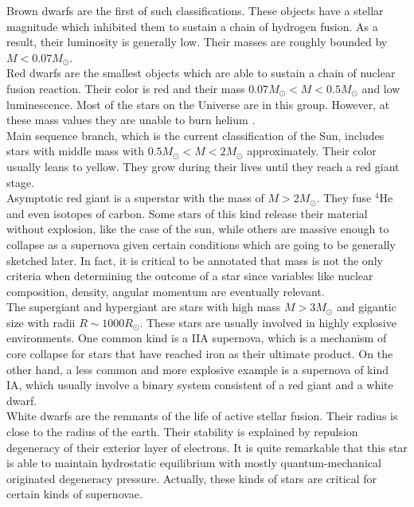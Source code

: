 \documentclass[openany]{book}
\begin{document}
Brown dwarfs are the first of such classifications. These objects have a stellar magnitude which inhibited them to sustain a chain of hydrogen fusion. As a result, their luminosity is generally low. Their masses are roughly bounded by $M < 0.07M_{\odot}$. \\

Red dwarfs are the smallest objects which are able to sustain a chain of nuclear fusion reaction. Their color is red and their mass $ 0.07M_{\odot} < M < 0.5 M_{\odot} $ and low luminescence. Most of the stars on the Universe are in this group. However, at these mass values they are unable to burn helium \cite{kundt_2005}. \\

Main sequence branch, which is the current classification of the Sun, includes stars with middle mass with $ 0.5M_{\odot} < M < 2M_{\odot}$ approximately. Their color usually leans to yellow. They grow during their lives until they reach a red giant stage. \\

Asymptotic red giant is a superstar with the mass of $M > 2M_{\odot}$. They fuse $\mathrm{{}^{4}He}$ and even isotopes of carbon. Some stars of this kind release their material without explosion, like the case of the sun, while others are massive enough to collapse as a supernova given certain conditions which are going to be generally sketched later. In fact, it is critical to be annotated that mass is not the only criteria when determining the outcome of a star since variables like nuclear composition, density, angular momentum are eventually relevant.  \\

The supergiant and hypergiant are stars with high mass $M > 3M_{\odot}$ and gigantic size with radii $R \sim 1000R_{\odot}$. These stars are usually involved in highly explosive environments. One common kind is a IIA supernova, which is a mechanism of core collapse for stars that have reached iron as their ultimate product. On the other hand, a less common and more explosive example is a supernova of kind IA, which usually involve a binary system consistent of a red giant and a white dwarf. \\

White dwarfs are the remnants of the life of active stellar fusion. Their radius is close to the radius of the earth. Their stability is explained by repulsion degeneracy of their exterior layer of electrons. It is quite remarkable that this star is able to maintain hydrostatic equilibrium with mostly quantum-mechanical originated degeneracy pressure. Actually, these kinds of stars are critical for certain kinds of supernovae. \\ 
\end{document}
